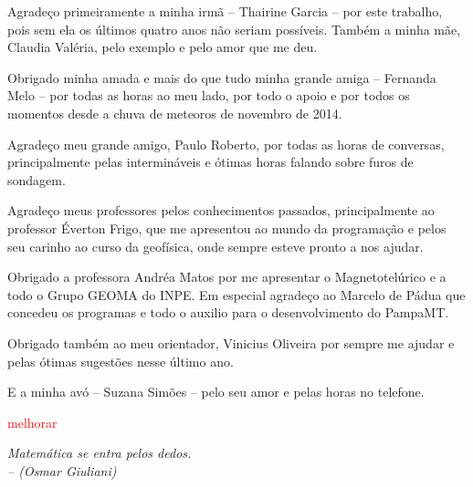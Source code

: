 \documentclass[12pt,twoside,oneright,a4paper,chapter=TITLE,english,brazil]{unipampa}
\newcommand{\citar}[1]{\textcolor{red}{#1}}
\begin{document}
\begin{agradecimentos}
    Agradeço primeiramente a minha irmã -- Thairine Garcia -- por este trabalho, pois sem ela os últimos quatro anos não seriam possíveis. Também a minha mãe, Claudia Valéria, pelo exemplo e pelo amor que me deu. 
    
    \SingleSpacing
    \OnehalfSpacing
    
    \noindent Obrigado minha amada e mais do que tudo minha grande amiga -- Fernanda Melo -- por todas as horas ao meu lado, por todo o apoio e por todos os momentos desde a chuva de meteoros de novembro de 2014.
    
    \SingleSpacing
    \OnehalfSpacing
    
    \noindent Agradeço meu grande amigo, Paulo Roberto, por todas as horas de conversas, principalmente pelas intermináveis e ótimas horas falando sobre furos de sondagem.  
    
    \SingleSpacing
    \OnehalfSpacing
    
    \noindent Agradeço meus professores pelos conhecimentos passados, principalmente ao professor Éverton Frigo, que me apresentou ao mundo da programação e pelos seu carinho ao curso da geofísica, onde sempre esteve pronto a nos ajudar.
    
    \SingleSpacing
    \OnehalfSpacing
    
    \noindent Obrigado a professora Andréa Matos por me apresentar o Magnetotelúrico e a todo o Grupo GEOMA do INPE. Em especial agradeço ao Marcelo de Pádua que concedeu os programas e todo o auxilio para o desenvolvimento do PampaMT.   
    
    \SingleSpacing
    \OnehalfSpacing

    \noindent Obrigado também ao meu orientador, Vinicius Oliveira por sempre me ajudar e pelas ótimas sugestões nesse último ano.
    
    \SingleSpacing
    \OnehalfSpacing
    
    \noindent E a minha avó -- Suzana Simões -- pelo seu amor e pelas horas no telefone.
    
    \citar{melhorar}
\end{agradecimentos}


\begin{epigrafe}
    \textit{Matemática se entra pelos dedos.
    \DoubleSpacing \\
    -- (Osmar Giuliani)}
\end{epigrafe}
\end{document}
